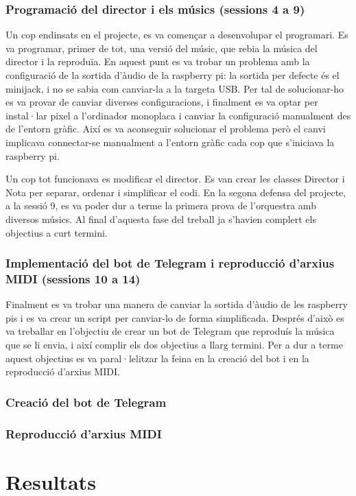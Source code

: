 \documentclass[a4paper]{article}
\begin{document}
\subsubsection{Programació del director i els músics (sessions 4 a 9)}
Un cop endinsats en el projecte, es va començar a desenvolupar el programari. Es va programar, primer de tot, una versió del músic, que rebia la música del director i la reproduïa. En aquest punt es va trobar un problema amb la configuració de la sortida d'àudio de la raspberry pi: la sortida per defecte és el minijack, i no se sabia com canviar-la a la targeta USB. Per tal de solucionar-ho es va provar de canviar diverses configuracions, i finalment es va optar per instal·lar pixel a l'ordinador monoplaca i canviar la configuració manualment des de l'entorn gràfic. Així es va aconseguir solucionar el problema però el canvi implicava connectar-se manualment a l'entorn gràfic cada cop que s'iniciava la raspberry pi.

Un cop tot funcionava es modificar el director. Es van crear les classes Director i Nota per separar, ordenar i simplificar el codi. En la segona defensa del projecte, a la sessió 9, es va poder dur a terme la primera prova de l'orquestra amb diversos músics. Al final d'aquesta fase del treball ja s'havien complert els objectius a curt termini.

\subsubsection{Implementació del bot de Telegram i reproducció d'arxius MIDI (sessions 10 a 14)}
Finalment es va trobar una manera de canviar la sortida d'àudio de les raspberry pis i es va crear un script per canviar-lo de forma simplificada. Després d'això es va treballar en l'objectiu de crear un bot de Telegram que reproduís la música que se li envia, i així complir els dos objectius a llarg termini. Per a dur a terme aquest objectius es va paral·lelitzar la feina en la creació del bot i en la reproducció d'arxius MIDI.

\subsubsection{Creació del bot de Telegram}

\subsubsection{Reproducció d'arxius MIDI}


\section{Resultats}



\printbibliography
\end{document}
